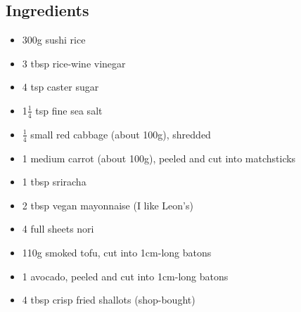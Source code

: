 \documentclass{book}
\begin{document}
\subsection*{Ingredients}
\begin{itemize}
\item 300g sushi rice
\item 3 tbsp rice-wine vinegar 
\item 4 tsp caster sugar 
\item 1$\frac{1}{4}$ tsp fine sea salt 
\item $\frac{1}{4}$ small red cabbage (about 100g), shredded 
\item 1 medium carrot (about 100g), peeled and cut into matchsticks
\item 1 tbsp sriracha
\item 2 tbsp vegan mayonnaise (I like Leon’s)
\item 4 full sheets nori
\item 110g smoked tofu, cut into 1cm-long batons 
\item 1 avocado, peeled and cut into 1cm-long batons
\item 4 tbsp crisp fried shallots (shop-bought)
\end{itemize}
\end{document}

